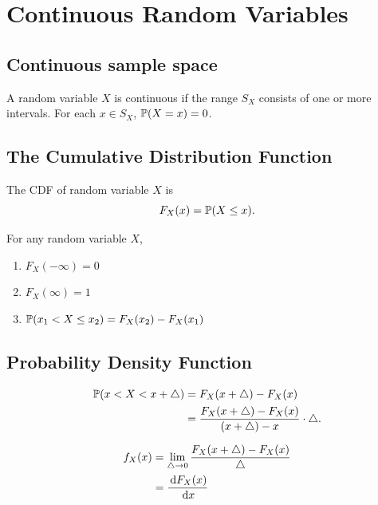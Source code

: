 \chapter{Continuous Random Variables}


\section{Continuous sample space} 
\begin{axiom}
    A random variable $X$ is continuous if the range $S_X$ consists of one or more intervals. For each $x\in S_X$, $\P{X=x}=0$. 
\end{axiom}


\section{The Cumulative Distribution Function}
\begin{definition}
    The CDF of random variable $X$ is 
    \[F_X(x) = \P{X\leq x}.\]
\end{definition}

\begin{theorem}
    For any random variable $X$,
    \begin{enumerate}
        \item $F_X(-\infty)=0$
        \item $F_X(\infty)=1$
        \item $\P{x_1<X\leq x_2} = F_X(x_2)-F_X(x_1)$
    \end{enumerate}
\end{theorem}


\section{Probability Density Function}
\begin{align*}
    \P{x<X<x+\triangle} 
    &= F_X(x+\triangle)-F_X(x) \\
    &= \frac{F_X(x+\triangle)-F_X(x)}{(x+\triangle)-x}\cdot\triangle.
\end{align*}
\begin{definition}  
    \begin{align*}
        f_X(x) 
        &= \lim_{\triangle\rightarrow 0}\frac{F_X(x+\triangle)-F_X(x)}{\triangle} \\
        &= \frac{\,\mathrm{d} F_X(x)}{\,\mathrm{d} x}
    \end{align*}
\end{definition}

